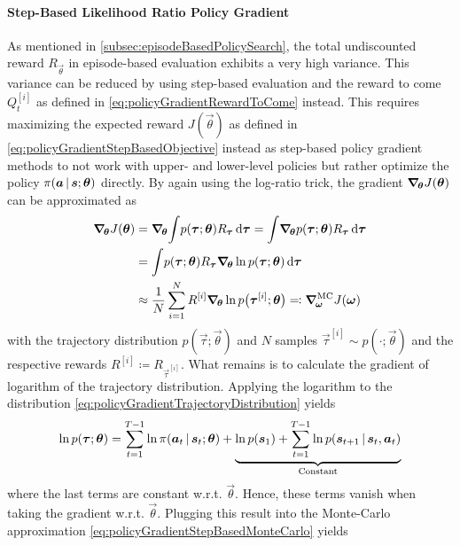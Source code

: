 				\paragraph{Step-Based Likelihood Ratio Policy Gradient}
					As mentioned in \autoref{subsec:episodeBasedPolicySearch}, the total undiscounted reward \( R_{\vec{\theta}} \) in episode-based evaluation exhibits a very high variance. This variance can be reduced by using step-based evaluation and the reward to come \( Q_t^{[i]} \) as defined in \eqref{eq:policyGradientRewardToCome} instead. This requires maximizing the expected reward \( J(\vec{\theta}) \) as defined in \eqref{eq:policyGradientStepBasedObjective} instead as step-based policy gradient methods to not work with upper- and lower-level policies but rather optimize the policy \( \pi(\bm{a} \,\vert\, \bm{s}; \bm{\theta}) \) directly. By again using the log-ratio trick, the gradient \( \grad_{\!\bm{\theta}} J(\bm{\theta}) \) can be approximated as
					\begin{align}
						\grad_{\!\vec{\theta}} J(\vec{\theta})
							&= \grad_{\!\vec{\theta}} \!\int\! p(\vec{\tau}; \vec{\theta}) R_{\vec{\tau}} \dd{\vec{\tau}}
							 = \int\! \grad_{\!\vec{\theta}} p(\vec{\tau}; \vec{\theta}) R_{\vec{\tau}} \dd{\vec{\tau}}  \nonumber \\
							&= \int\! p(\vec{\tau}; \vec{\theta}) R_{\vec{\tau}} \grad_{\!\vec{\theta}} \ln p(\vec{\tau}; \vec{\theta}) \dd{\vec{\tau}}  \nonumber \\
							&\approx \frac{1}{N} \sum_{i = 1}^{N} R^{[i]} \grad_{\!\vec{\theta}} \ln p\big(\vec{\tau}^{[i]}; \vec{\theta}\big) \eqqcolon \grad_{\!\vec{\omega}}^\mathrm{MC} J(\vec{\omega})  \label{eq:policyGradientStepBasedMonteCarlo}
					\end{align}
					with the trajectory distribution \( p(\vec{\tau}; \vec{\theta}) \) and \(N\) samples \( \vec{\tau}^{[i]} \sim p(\cdot; \vec{\theta}) \) and the respective rewards \( R^{[i]} \coloneqq R_{\vec{\tau}^{[i]}} \). What remains is to calculate the gradient of logarithm of the trajectory distribution. Applying the logarithm to the distribution \eqref{eq:policyGradientTrajectoryDistribution} yields
					\begin{equation*}
						\ln p(\bm{\tau}; \bm{\theta}) = \sum_{t = 1}^{T - 1} \ln \pi(\bm{a}_t \,\vert\, \bm{s}_t; \bm{\theta}) + \underbrace{\ln p(\bm{s}_1) + \sum_{t = 1}^{T - 1} \ln p(\bm{s}_{t + 1} \,\vert\, \bm{s}_t, \bm{a}_t)}_{\text{Constant}}
					\end{equation*}
					where the last terms are constant w.r.t. \(\vec{\theta}\). Hence, these terms vanish when taking the gradient w.r.t. \(\vec{\theta}\). Plugging this result into the Monte-Carlo approximation \eqref{eq:policyGradientStepBasedMonteCarlo} yields
